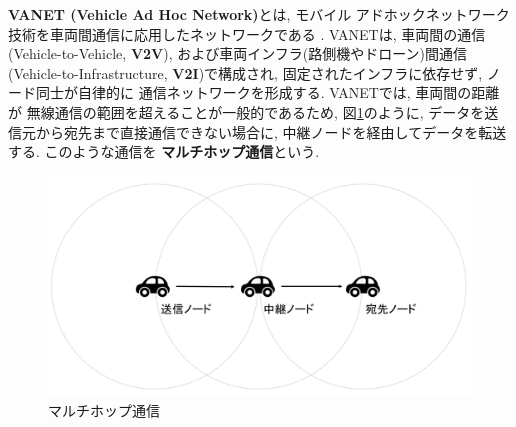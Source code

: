 \textbf{VANET (Vehicle Ad Hoc Network)}とは, モバイル
アドホックネットワーク技術を車両間通信に応用したネットワークである
\cite{adhoc,vanet}. VANETは, 車両間の通信(Vehicle-to-Vehicle, 
\textbf{V2V}), および車両インフラ(路側機やドローン)間通信
(Vehicle-to-Infrastructure, \textbf{V2I})\cite{drone}で構成され, 
固定されたインフラに依存せず, ノード同士が自律的に
通信ネットワークを形成する. VANETでは, 車両間の距離が
無線通信の範囲を超えることが一般的であるため, 図\ref{fig:vanet}のように, 
データを送信元から宛先まで直接通信できない場合に, 
中継ノードを経由してデータを転送する. このような通信を
\textbf{マルチホップ通信}という.

\begin{figure}
  \centering
  \includegraphics[scale=0.6]{figures/vanet.png}
  \caption{マルチホップ通信\cite{shinato}}
  \label{fig:vanet}
\end{figure}


